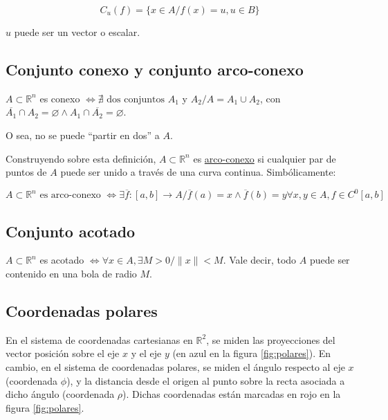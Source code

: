 \documentclass{article}
\renewcommand{\Bbb}{\mathbb}
\begin{document}
\begin{equation}
C_u(f) = \{ x \in A / f(x) = u, u \in B \}
\end{equation}

$u$ puede ser un vector o escalar.

\subsection{Conjunto conexo y conjunto arco-conexo}

$A \subset \Bbb R^n$ es conexo $\Longleftrightarrow \nexists \text{ dos conjuntos } A_1$ y $A_2 / A = A_1 \cup A_2$, con $\overline{A_1} \cap A_2 = \varnothing \wedge A_1 \cap \overline{A_2} = \varnothing$.

O sea, no se puede ``partir en dos'' a $A$.

Construyendo sobre esta definición, $A \subset \Bbb R^n$ es \underline{arco-conexo} si cualquier par de puntos de $A$ puede ser unido a través de una curva continua. Simbólicamente:

\begin{equation}
A \subset \Bbb R^n \text{ es arco-conexo } \Longleftrightarrow \exists \overline{f}: [a,b] \rightarrow A / \overline{f}(a) = x \wedge \overline{f}(b) = y \forall x,y \in A, f \in C^0[a,b]
\end{equation}

\subsection{Conjunto acotado}

$A \subset \Bbb R^n$ es acotado $\Longleftrightarrow \forall x \in A, \exists M > 0 / \|x\| < M$. Vale decir, todo $A$ puede ser contenido en una bola de radio $M$.

\subsection{Coordenadas polares}

En el sistema de coordenadas cartesianas en $\Bbb R^2$, se miden las proyecciones del vector posición sobre el eje $x$ y el eje $y$ (en azul en la figura \ref{fig:polares}). En cambio, en el sistema de coordenadas polares, se miden el ángulo respecto al eje $x$ (coordenada $\phi$), y la distancia desde el origen al punto sobre la recta asociada a dicho ángulo (coordenada $\rho$). Dichas coordenadas están marcadas en rojo en la figura \ref{fig:polares}.
\end{document}
